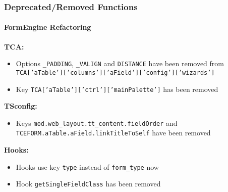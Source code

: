 \begin{frame}[fragile]
	\frametitle{Deprecated/Removed Functions}
	\framesubtitle{FormEngine Refactoring}

		\textbf{TCA:}

			\small
			\begin{itemize}

				\item Options \texttt{\_PADDING}, \texttt{\_VALIGN} and \texttt{DISTANCE}
					have been removed from
					\texttt{TCA['aTable']['columns']['aField']['config']['wizards']}

				\item Key \texttt{TCA['aTable']['ctrl']['mainPalette']} has been removed

			\end{itemize}

		\textbf{TSconfig:}

			\small
			\begin{itemize}
				\item Keys \texttt{mod.web\_layout.tt\_content.fieldOrder} and
					\texttt{TCEFORM.aTable.aField.linkTitleToSelf} have been removed
			\end{itemize}

		\textbf{Hooks:}

			\small
			\begin{itemize}
				\item Hooks use key \texttt{type} instead of \texttt{form\_type} now
				\item Hook \texttt{getSingleFieldClass} has been removed
			\end{itemize}

\end{frame}


